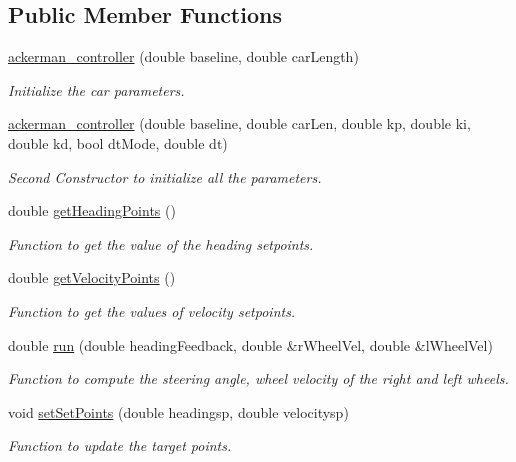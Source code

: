 \subsection*{Public Member Functions}
\begin{DoxyCompactItemize}
\item 
\hyperlink{classackerman__controller_a2501aaf8866f31033b029135e9a07a06}{ackerman\+\_\+controller} (double baseline, double car\+Length)
\begin{DoxyCompactList}\small\item\em Initialize the car parameters. \end{DoxyCompactList}\item 
\hyperlink{classackerman__controller_a8ce4def42fb84ddd2d0ead34b99c0724}{ackerman\+\_\+controller} (double baseline, double car\+Len, double kp, double ki, double kd, bool dt\+Mode, double dt)
\begin{DoxyCompactList}\small\item\em Second Constructor to initialize all the parameters. \end{DoxyCompactList}\item 
double \hyperlink{classackerman__controller_a5638d86309c34d185bed37275c153c65}{get\+Heading\+Points} ()
\begin{DoxyCompactList}\small\item\em Function to get the value of the heading setpoints. \end{DoxyCompactList}\item 
double \hyperlink{classackerman__controller_aaf95cf16e95bce3a68625e7f7d57c45e}{get\+Velocity\+Points} ()
\begin{DoxyCompactList}\small\item\em Function to get the values of velocity setpoints. \end{DoxyCompactList}\item 
double \hyperlink{classackerman__controller_a2b08918e113a5ae0ebd1b976801bec7c}{run} (double heading\+Feedback, double \&r\+Wheel\+Vel, double \&l\+Wheel\+Vel)
\begin{DoxyCompactList}\small\item\em Function to compute the steering angle, wheel velocity of the right and left wheels. \end{DoxyCompactList}\item 
void \hyperlink{classackerman__controller_aba2b7c99bcdcd50e5ea36012fe849000}{set\+Set\+Points} (double headingsp, double velocitysp)
\begin{DoxyCompactList}\small\item\em Function to update the target points. \end{DoxyCompactList}\item 

\end{DoxyCompactItemize}
